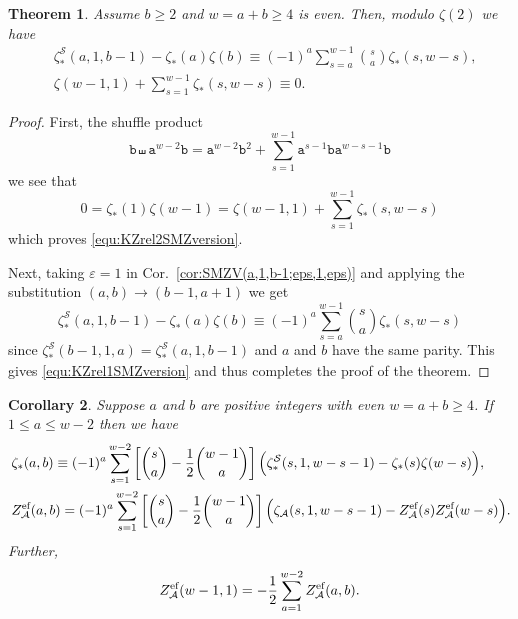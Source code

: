 \documentclass{article}
\newcommand{\sha}{\shuffle}
\newcommand{\Sy}{{\mathcal S}}
\newcommand\ta{{\texttt{a}}}
\newcommand\tb{{\texttt{b}}}
\newcommand\eps{{\varepsilon}}
\newcommand{\calA}{\mathcal{A}}
\newcommand{\eff}{\text{\rm{ef}}}
\theoremstyle{plain}
\newtheorem{thm}{Theorem}[section]
\newtheorem{cor}[thm]{Corollary}
\theoremstyle{definition}
\begin{document}
\begin{thm}\label{thm:KZeffDBZs}
Assume $b\ge 2$ and $w=a+b\ge 4$ is even. Then, modulo $\zeta(2)$ we have
\begin{align}\label{equ:KZrel1SMZversion}
&\zeta_\ast^\Sy(a,1,b-1)-\zeta_*(a)\zeta(b)
\equiv  (-1)^a \sum_{s=a}^{w-1}  \binom{s}{a}  \zeta_*(s,w-s), \\
&\zeta(w-1,1)+\sum_{s=1}^{w-1} \zeta_*(s,w-s)\equiv 0. \label{equ:KZrel2SMZversion}
\end{align}
\end{thm}
\begin{proof}
First,  the shuffle product
\begin{equation*}
   \tb\sha \ta^{w-2}  \tb=\ta^{w-2} \tb^2 +\sum_{s=1}^{w-1} \ta^{s-1} \tb \ta^{w-s-1} \tb
\end{equation*}
we see that
\begin{equation*}
    0=\zeta_*(1)\zeta(w-1)=\zeta(w-1,1)+\sum_{s=1}^{w-1} \zeta_*(s,w-s)
\end{equation*}
which proves \eqref{equ:KZrel2SMZversion}.

Next, taking $\eps=1$ in Cor.~\ref{cor:SMZV(a,1,b-1;eps,1,eps)} and applying the substitution $(a,b)\to (b-1,a+1)$ we get
\begin{equation}\label{equ:checkb=2}
\zeta_\ast^\Sy(a,1,b-1)-\zeta_*(a)\zeta(b)
\equiv   (-1)^a \sum_{s=a}^{w-1} \binom{s}{a}  \zeta_*(s,w-s)
\end{equation}
since $\zeta_\ast^\Sy(b-1,1,a)=\zeta_\ast^\Sy(a,1,b-1)$ and $a$ and $b$ have the same parity.  This gives \eqref{equ:KZrel1SMZversion} and thus completes the proof of the theorem.
\end{proof}


\begin{cor}\label{cor:KZeffDBZs}
Suppose $a$ and $b$ are positive integers with even $w=a+b\ge 4$. If $1\le a\le w-2$ then we have
\begin{align} \label{equ:KZrel3SMZversion}
&\, \zeta_*(a,b)\equiv (-1)^a \sum_{s=1}^{w-2} \left[ \binom{s}{a}-\frac12\binom{w-1}{a}\right] \Big(\zeta_\ast^\Sy(s,1,w-s-1)-\zeta_*(s)\zeta(w-s)\Big),\\
&\, Z_\calA^\eff(a,b)=(-1)^a \sum_{s=1}^{w-2} \left[ \binom{s}{a}-\frac12\binom{w-1}{a}\right] \Big(\zeta_\calA(s,1,w-s-1)-Z_\calA^\eff(s)Z_\calA^\eff(w-s)\Big). \label{equ:KZrel3FMZversion}
\end{align}
Further,
\begin{align} \label{equ:KZrel3FMZversion2}
Z_\calA^\eff(w-1,1)=-\frac12 \sum_{a=1}^{w-2}Z_\calA^\eff(a,b).
\end{align}
\end{cor}
\end{document}
